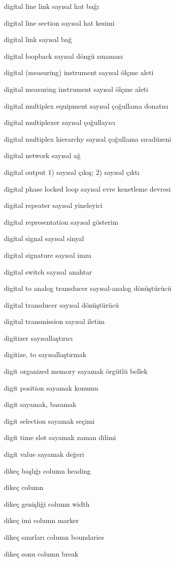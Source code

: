 \documentclass[12pt,fleqn]{article}\usepackage{../../common}
\begin{document}
digital line link sayısal hat bağı

digital line section sayısal hat kesimi

digital link sayısal bağ

digital loopback sayısal döngü sınaması

digital (measuring) instrument sayısal ölçme aleti

digital measuring instrument sayısal ölçme aleti

digital multiplex equipment sayısal çoğullama donatısı

digital multiplexer sayısal çoğullayıcı

digital multiplex hierarchy sayısal çoğullama sıradüzeni

digital network sayısal ağ

digital output 1) sayısal çıkış; 2) sayısal çıktı

digital phase locked loop sayısal evre kenetleme devresi

digital repeater sayısal yineleyici

digital representation sayısal gösterim

digital signal sayısal sinyal

digital signature sayısal imza

digital switch sayısal anahtar

digital to analog transducer sayısal-analog dönüştürücü

digital transducer sayısal dönüştürücü

digital transmission sayısal iletim

digitizer sayısallaştırıcı

digitize, to sayısallaştırmak

digit organized memory sayamak örgütlü bellek

digit position sayamak konumu

digit sayamak, basamak

digit selection sayamak seçimi

digit time slot sayamak zaman dilimi

digit value sayamak değeri

dikeç başlığı column heading

dikeç column

dikeç genişliği column width

dikeç imi column marker

dikeç sınırları column boundaries

dikeç sonu column break
\end{document}
